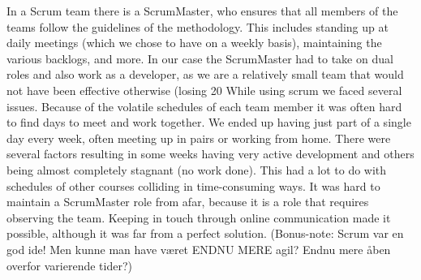 In a Scrum team there is a ScrumMaster, who ensures that all members of the teams follow the guidelines of the methodology. This includes standing up at daily meetings (which we chose to have on a weekly basis), maintaining the various backlogs, and more.
In our case the ScrumMaster had to take on dual roles and also work as a developer, as we are a relatively small team that would not have been effective otherwise (losing 20%
While using scrum we faced several issues.
Because of the volatile schedules of each team member it was often hard to find days to meet and work together. We ended up having just part of a single day every week, often meeting up in pairs or working from home.
There were several factors resulting in some weeks having very active development and others being almost completely stagnant (no work done). This had a lot to do with schedules of other courses colliding in time-consuming ways.
It was hard to maintain a ScrumMaster role from afar, because it is a role that requires observing the team. Keeping in touch through online communication made it possible, although it was far from a perfect solution.
(Bonus-note: Scrum var en god ide! Men kunne man have været ENDNU MERE agil? Endnu mere åben overfor varierende tider?)
